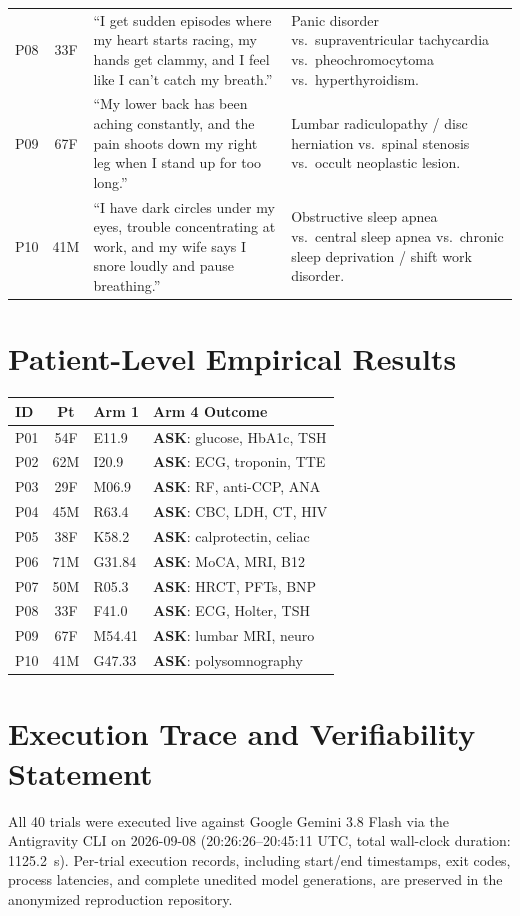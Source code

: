 \documentclass[pmlr,twocolumn,10pt]{jmlr} %
\begin{document}
\begin{table}[t]
{\begin{tabularx}{\textwidth}{@{}lcXp{5.5cm}@{}}
  P08 & 33F & ``I get sudden episodes where my heart starts racing, my hands get clammy, and I feel like I can't catch my breath.'' & Panic disorder vs.\ supraventricular tachycardia vs.\ pheochromocytoma vs.\ hyperthyroidism. \\
  P09 & 67F & ``My lower back has been aching constantly, and the pain shoots down my right leg when I stand up for too long.'' & Lumbar radiculopathy / disc herniation vs.\ spinal stenosis vs.\ occult neoplastic lesion. \\
  P10 & 41M & ``I have dark circles under my eyes, trouble concentrating at work, and my wife says I snore loudly and pause breathing.'' & Obstructive sleep apnea vs.\ central sleep apnea vs.\ chronic sleep deprivation / shift work disorder. \\
  \bottomrule
  \end{tabularx}
  }
\end{table}

\section{Patient-Level Empirical Results}
\label{apd:cases}

{\small
\begin{tabularx}{\columnwidth}{@{}lcll@{}}
\toprule
\textbf{ID} & \textbf{Pt} & \textbf{Arm 1} & \textbf{Arm 4 Outcome} \\
\midrule
P01 & 54F & E11.9 & \textbf{ASK}: glucose, HbA1c, TSH \\
P02 & 62M & I20.9 & \textbf{ASK}: ECG, troponin, TTE \\
P03 & 29F & M06.9 & \textbf{ASK}: RF, anti-CCP, ANA \\
P04 & 45M & R63.4 & \textbf{ASK}: CBC, LDH, CT, HIV \\
P05 & 38F & K58.2 & \textbf{ASK}: calprotectin, celiac \\
P06 & 71M & G31.84 & \textbf{ASK}: MoCA, MRI, B12 \\
P07 & 50M & R05.3 & \textbf{ASK}: HRCT, PFTs, BNP \\
P08 & 33F & F41.0 & \textbf{ASK}: ECG, Holter, TSH \\
P09 & 67F & M54.41 & \textbf{ASK}: lumbar MRI, neuro \\
P10 & 41M & G47.33 & \textbf{ASK}: polysomnography \\
\bottomrule
\end{tabularx}
}

\section{Execution Trace and Verifiability Statement}
\label{apd:verifiability}

All 40 trials were executed live against Google Gemini 3.8 Flash via the Antigravity CLI on 2026-09-08 (20:26:26--20:45:11 UTC, total wall-clock duration: \SI{1125.2}{\second}). Per-trial execution records, including start/end timestamps, exit codes, process latencies, and complete unedited model generations, are preserved in the anonymized reproduction repository.
\end{document}
